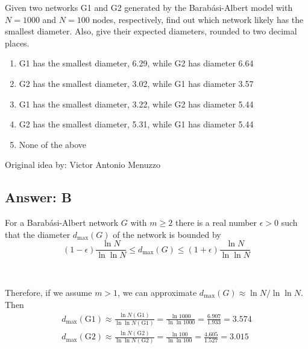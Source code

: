 
Given two networks G1 and G2 generated by the Barabási-Albert model with $N = 1000$ and $N = 100$ nodes, respectively, find out which network likely has the smallest diameter. Also, give their expected diameters, rounded to two decimal places.

\begin{enumerate}[label={\Alph*.}]
    \item G1 has the smallest diameter, 6.29, while G2 has diameter 6.64
    \item G2 has the smallest diameter, 3.02, while G1 has diameter 3.57
    \item G1 has the smallest diameter, 3.22, while G2 has diameter 5.44
    \item G2 has the smallest diameter, 5.31, while G1 has diameter 5.44
    \item None of the above
\end{enumerate}

Original idea by: Victor Antonio Menuzzo


\subsection*{Answer: B}

For a Barabási-Albert network $G$ with $m \geq 2$ there is a real number $\epsilon > 0$ such that the diameter $d_{\max}(G)$ of the network is bounded by \[
    (1 - \epsilon) \frac{\ln N}{\ln \ln N} \leq d_{\max}(G) \leq (1 + \epsilon) \frac{\ln N}{\ln \ln N}
\] \cite{diameter}

~

Therefore, if we assume $m > 1$, we can approximate $d_{\max}(G) \approx \ln N / \ln \ln N$. Then
\begin{gather*}
    d_{\max}(\text{G1})
        \approx \frac{\ln N(\text{G1})}{\ln \ln N(\text{G1})}
        = \frac{\ln 1000}{\ln \ln 1000}
        = \frac{6.907}{1.933}
        = 3.574
    \\
    d_{\max}(\text{G2})
        \approx \frac{\ln N(\text{G2})}{\ln \ln N(\text{G2})}
        = \frac{\ln 100}{\ln \ln 100}
        = \frac{4.605}{1.527}
        = 3.015
\end{gather*}
